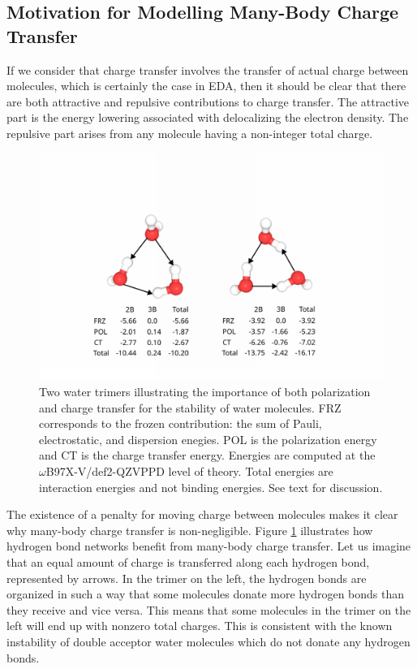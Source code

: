 \documentclass[journal=jctcce,manuscript=article]{achemso}
\begin{document}
\subsection*{Motivation for Modelling Many-Body Charge Transfer}
If we consider that charge transfer involves the transfer of actual charge between
molecules, which is certainly the case in EDA\cite{thirman2018characterizing},
then it should be clear that there are both attractive and repulsive contributions
to charge transfer. The attractive part is the energy lowering associated with delocalizing
the electron density. The repulsive part arises from any molecule having a non-integer
total charge.


\begin{figure}[H]
  \includegraphics*[width=\textwidth]{figures/trimer_mbe_example.png}
  \caption{Two water trimers illustrating the importance of both polarization
  and charge transfer for the stability of water molecules. FRZ corresponds to
  the frozen contribution: the sum of Pauli, electrostatic, and dispersion enegies. POL is the polarization
  energy and CT is the charge transfer energy. Energies are computed at the
  $\omega$B97X-V/def2-QZVPPD level of theory. Total energies are
  interaction energies and not binding energies. See text for discussion.}
  \label{fig:trimer}
\end{figure}

The existence of a penalty for moving charge between molecules makes it clear why many-body charge transfer is non-negligible. Figure \ref{fig:trimer} illustrates how hydrogen bond networks benefit from many-body charge transfer. Let us imagine that an equal amount of charge is transferred along each hydrogen bond, represented by arrows.  In the trimer on the left, the hydrogen bonds are organized in such a way that some molecules donate more hydrogen bonds than they receive and vice versa. This means that some molecules in the trimer on the left will end up with nonzero total charges. This is consistent with the known instability of double acceptor water molecules which do not donate any hydrogen bonds.\cite{kirov2008identifying}
\end{document}
